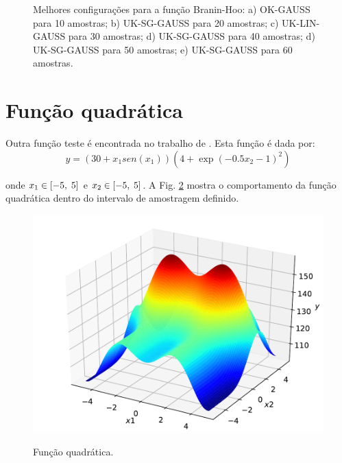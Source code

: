 \begin{figure}[H]
	\caption{Melhores configurações para a função Branin-Hoo: a) OK-GAUSS para 10 amostras; b) UK-SG-GAUSS para 20 amostras; c) UK-LIN-GAUSS para 30 amostras; d) UK-SG-GAUSS para 40 amostras; d) UK-SG-GAUSS para 50 amostras; e) UK-SG-GAUSS para 60 amostras.} 
	\label{fig:branin1}
\end{figure}

\section{Função quadrática}

 Outra função teste é encontrada no trabalho de . Esta função é dada por:
 \begin{equation}
 y= \left(30+{x_1}sen{(x_1)}\right)\left(4+\exp(-0.5{x_2}-1)^2 \right)
 \label{eq: 40}
 \end{equation}
 
 \noindent onde ${x_1} \in [-5,\hspace{0.1 cm}5]$ e ${x_2} \in [-5,\hspace{0.1 cm}5]$. A Fig. \ref{fig:leo} mostra o comportamento da função quadrática dentro do intervalo de amostragem definido.
  
 \begin{figure}[H]
 	\centering
 	{\includegraphics[width=0.7\linewidth]{tatiane/fig_tati/func_leo/fig2_orig.pdf}} 
 	\caption{Função quadrática.} 
 	\label{fig:leo}
 \end{figure}

